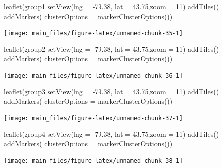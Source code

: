 \begin{Schunk}
\begin{Sinput}
leaflet(group1 %
  setView(lng = -79.38, lat = 43.75,zoom = 11) %
   addTiles() %
  addMarkers(
  clusterOptions = markerClusterOptions())
\end{Sinput}


\begin{center}\texttt{[image: main\_files/figure-latex/unnamed-chunk-35-1]} \end{center}

\end{Schunk}

\begin{Schunk}
\begin{Sinput}
leaflet(group2 %
  setView(lng = -79.38, lat = 43.75,zoom = 11) %
   addTiles() %
  addMarkers(
  clusterOptions = markerClusterOptions())
\end{Sinput}


\begin{center}\texttt{[image: main\_files/figure-latex/unnamed-chunk-36-1]} \end{center}

\end{Schunk}

\begin{Schunk}
\begin{Sinput}
leaflet(group3 %
  setView(lng = -79.38, lat = 43.75,zoom = 11) %
   addTiles() %
  addMarkers(
  clusterOptions = markerClusterOptions())
\end{Sinput}


\begin{center}\texttt{[image: main\_files/figure-latex/unnamed-chunk-37-1]} \end{center}

\end{Schunk}

\begin{Schunk}
\begin{Sinput}
leaflet(group4 %
  setView(lng = -79.38, lat = 43.75,zoom = 11) %
   addTiles() %
  addMarkers(
  clusterOptions = markerClusterOptions())
\end{Sinput}


\begin{center}\texttt{[image: main\_files/figure-latex/unnamed-chunk-38-1]} \end{center}

\end{Schunk}

